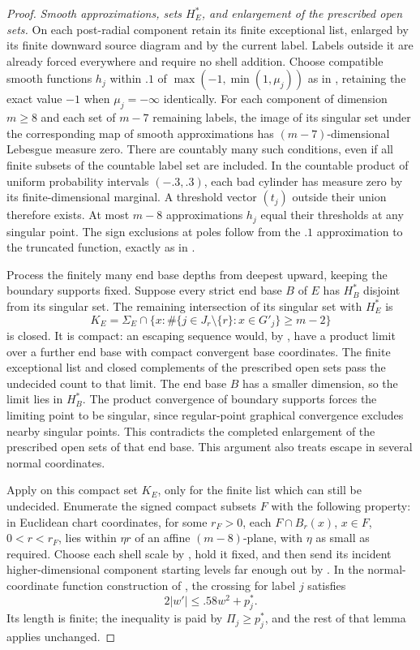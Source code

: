 \begin{proof}
\emph{Smooth approximations, sets $H_E^*$, and enlargement of the prescribed open sets.}
On each post-radial component retain its finite exceptional list, enlarged
by its finite downward source diagram and by the current label.
Labels outside it are already forced everywhere and require no shell
addition. Choose compatible smooth functions $h_j$ within $.1$ of
$\max(-1,\min(1,\mu_j))$ as in , retaining the exact
value $-1$ when $\mu_j=-\infty$ identically. For each component of dimension $m\ge8$ and each set of $m-7$
remaining labels, the image of its singular set under the corresponding
map of smooth approximations has $(m-7)$-dimensional Lebesgue measure zero.
There are countably many such conditions, even if all finite subsets
of the countable label set are included. In the countable product of
uniform probability intervals $(-.3,.3)$, each bad cylinder has
measure zero by its finite-dimensional marginal. A threshold vector $(t_j)$
outside their union therefore exists. At most $m-8$ approximations $h_j$ equal
their thresholds at any singular point. The sign exclusions at poles
follow from the $.1$ approximation to the truncated function, exactly as in
.

Process the finitely many end base depths from deepest upward, keeping the
boundary supports fixed. Suppose every strict end base $B$ of $E$ has $H_B^*$ disjoint from its singular set.
The remaining intersection of its singular set with $H_E^*$ is
\[
 K_E=\Sigma_E\cap
 \{x:\#\{j\in J_r\setminus\{r\}:x\in G'_j\}\ge m-2\}
\]
is closed. It is compact: an escaping sequence would, by
, have a product limit over a further end base with
compact convergent base coordinates. The finite exceptional list and
closed complements of the prescribed open sets pass the undecided count to that limit.
The end base $B$ has a smaller dimension, so the limit lies in $H_B^*$.
The product convergence of boundary supports forces the limiting point to be
singular, since regular-point graphical convergence excludes nearby
singular points. This contradicts the completed enlargement of the prescribed open sets of that
end base. This argument also treats escape in several normal coordinates.

Apply  on this compact
set $K_E$, only for the finite list which can still be undecided.
Enumerate the signed compact subsets $F$ with the following property:
in Euclidean chart coordinates, for some $r_F>0$, each $F\cap B_r(x)$,
$x\in F$, $0<r<r_F$, lies within $\eta r$ of an affine $(m-8)$-plane,
with $\eta$ as small as required. Choose each shell scale by
, hold it fixed, and then send its incident higher-dimensional component starting levels
far enough out by . In the normal-coordinate function construction
of , the crossing for label $j$ satisfies
\[
 2|w'|\le .58w^2+p_j^*.
\]
Its length is finite; the inequality is paid by $\Pi_j\ge p_j^*$,
and the rest of that lemma applies unchanged.


\end{proof}
